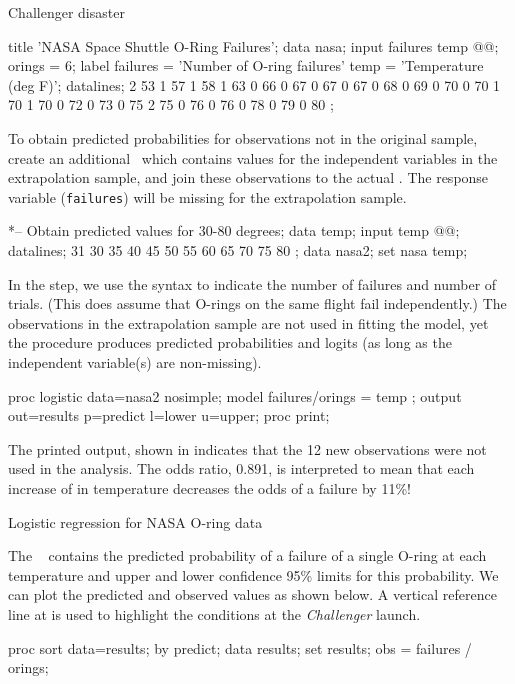\begin{Example}[nasa]{Challenger disaster}
\begin{listing}
title 'NASA Space Shuttle O-Ring Failures';
data nasa;
   input failures temp @@;
   orings = 6;
   label failures = 'Number of O-ring failures'
      temp = 'Temperature (deg F)';
   datalines;
   2  53    1  57    1  58     1  63
   0  66    0  67    0  67     0  67
   0  68    0  69    0  70     0  70
   1  70    1  70    0  72     0  73
   0  75    2  75    0  76     0  76
   0  78    0  79    0  80
;
\end{listing}
To obtain predicted probabilities for observations not in the original sample,
create an additional \Dset\ which contains values for the independent
variables in the extrapolation sample, and join these observations to the
actual \Dset.  The response variable (\texttt{failures}) will be missing
for the extrapolation sample.

\begin{listing}
*-- Obtain predicted values for 30-80 degrees;
data temp;
   input temp @@;
datalines;
31 30 35 40 45 50 55 60 65 70 75 80
;
data nasa2;
   set nasa temp;
\end{listing}
In the  step, we use the  syntax
to indicate the number of failures and number of trials.
(This does assume that O-rings on the same flight fail independently.)
The observations in the extrapolation sample are not used in fitting
the model, yet the procedure produces predicted probabilities and
logits (as long as the independent variable(s) are non-missing).

\begin{listing}
proc logistic data=nasa2 nosimple;
   model failures/orings = temp ;
   output out=results p=predict l=lower u=upper;
proc print;
\end{listing}
The printed output, shown in  indicates that the
12 new observations were not used in the analysis.
The odds ratio, 0.891, is interpreted to mean that each increase of
 in temperature decreases the odds of a failure by 11\%!

\begin{Output}[htbp]
\caption{Logistic regression for NASA O-ring data}\label{out:nasa.1}
\small

\end{Output}

The \ODS\  contains the predicted probability
of a failure of a single O-ring
at each temperature and upper and lower confidence 95\% limits
for this probability.  We can plot the predicted and observed values
as shown below.  A vertical reference line at  is used
to highlight the conditions at the \emph{Challenger} launch.
\begin{listing}
proc sort data=results;
   by predict;
data results;
   set results;
   obs = failures / orings;


\end{listing}
\end{Example}
